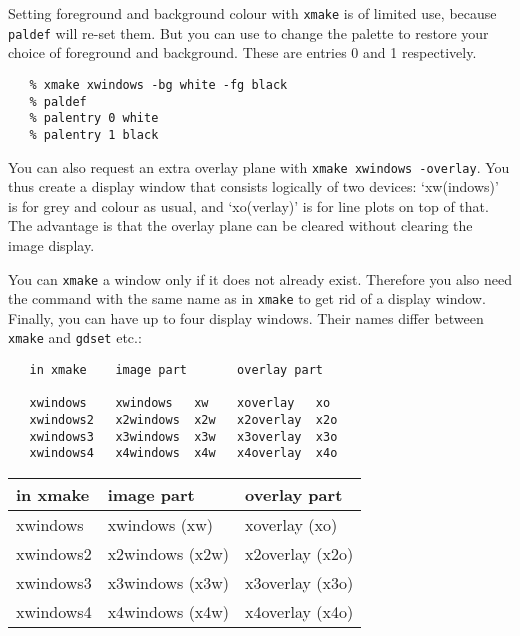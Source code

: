    Setting foreground and background colour with {\tt xmake} is of
   limited use, because {\tt paldef} will re-set them. But you can use
{\tt {}}
   to change the palette to restore your choice of foreground and
   background. These are entries 0 and 1 respectively.

\begin{verbatim}
   % xmake xwindows -bg white -fg black
   % paldef
   % palentry 0 white
   % palentry 1 black
\end{verbatim}

   You can also request an extra overlay plane with {\tt xmake xwindows
   -overlay}. You thus create a display window that consists
   logically of two devices: `xw(indows)' is for grey and colour as
   usual, and `xo(verlay)' is for line plots on top of that. The
   advantage is that the overlay plane can be cleared without clearing
   the image display.

   You can {\tt xmake} a window only if it does not already exist.
   Therefore you also need the command
{\tt {}}
   with the same name as in {\tt xmake} to get rid of a display
   window. Finally, you can have up to four
   display windows. Their names differ between {\tt xmake} and
   {\tt gdset} etc.:

\begin{htmlonly}
\begin{verbatim}
   in xmake    image part       overlay part

   xwindows    xwindows   xw    xoverlay   xo
   xwindows2   x2windows  x2w   x2overlay  x2o
   xwindows3   x3windows  x3w   x3overlay  x3o
   xwindows4   x4windows  x4w   x4overlay  x4o
\end{verbatim}
\end{htmlonly}

\begin{latexonly}
\begin{center}
\begin{tabular}{|l|l|l|}
\hline\hline
   in xmake  & image part     & overlay part\\
\hline
   xwindows  & xwindows   (xw)  & xoverlay   (xo)\\
   xwindows2 & x2windows  (x2w) & x2overlay  (x2o)\\
   xwindows3 & x3windows  (x3w) & x3overlay  (x3o)\\
   xwindows4 & x4windows  (x4w) & x4overlay  (x4o)\\
\hline\hline
\end{tabular}
\end{center}
\end{latexonly}


